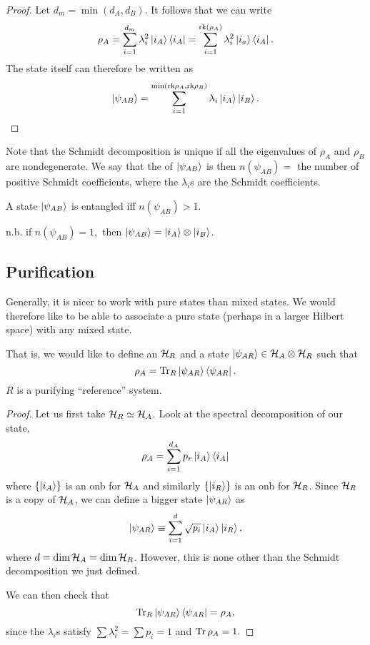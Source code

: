 \begin{proof}
    Let $d_m=\min(d_A,d_B)$. It follows that we can write
    \begin{equation}
        \rho_A = \sum_{i=1}^{d_m} \lambda_i^2 \left| i_A \right>\left< i_A \right| = \sum_{i=1}^{\text{rk}(\rho_A)}\lambda_i^2 \left| i_a \right>\left< i_A \right|.
    \end{equation}
    The state itself can therefore be written as
    \begin{equation}
        \left| \psi_{AB} \right>=\sum_{i=1}^{\min(\text{rk}\rho_A,\text{rk}\rho_B)} \lambda_i \left| i_A \right> \left| i_B \right>.
    \end{equation}
\end{proof}

Note that the Schmidt decomposition is unique if all the eigenvalues of $\rho_A$ and $\rho_B$ are nondegenerate. We say that the  of $\left| \psi_{AB} \right>$ is then $n(\psi_{AB})={}$ the number of positive Schmidt coefficients, where the $\lambda_i$s are the Schmidt coefficients.

\begin{thm}
    A state $\left| \psi_{AB} \right>$ is entangled iff $n(\psi_{AB}) >1$.
\end{thm}
n.b. if $n(\psi_{AB})=1,$ then $\left| \psi_{AB} \right>=\left| i_A \right>\otimes \left| i_B \right>$.

\subsection*{Purification} Generally, it is nicer to work with pure states than mixed states. We would therefore like to be able to associate a pure state (perhaps in a larger Hilbert space) with any mixed state.

That is, we would like to define an $\mathcal H_R$ and a state $\left| \psi_{AR} \right>\in \mathcal H_A \otimes \mathcal H_R$ such that
\begin{equation}
    \rho_A=\operatorname{Tr}_R \left| \psi_{AR} \right>\left< \psi_{AR} \right|.
\end{equation}
$R$ is a purifying ``reference'' system.
\begin{proof}
    Let us first take $\mathcal H_R \simeq \mathcal H_A$. Look at the spectral decomposition of our state,
    \begin{equation}
        \rho_A =\sum_{i=1}^{d_A} p_r \left| i_A \right>\left< i_A \right|
    \end{equation}
    where $\{\left| i_A \right>\}$ is an onb for $\mathcal H_A$ and similarly $\{\left| i_R \right>\}$ is an onb for $\mathcal H_R$. Since $\mathcal H_R$ is a copy of $\mathcal H_A$, we can define a bigger state $\left| \psi_{AR} \right>$ as
    \begin{equation}
        \left| \psi_{AR} \right>\equiv \sum_{i=1}^d \sqrt{p_i}\left| i_A \right> \left| i_R \right>,
    \end{equation}
    where $d=\dim \mathcal H_A = \dim \mathcal H_R$. However, this is none other than the Schmidt decomposition we just defined.
    
    We can then check that
    \begin{equation}
        \operatorname{Tr}_R \left| \psi_{AR} \right>\left< \psi_{AR} \right|= \rho_A,
    \end{equation}
    since the $\lambda_i$s satisfy $\sum \lambda_i^2 =\sum p_i =1$ and $\operatorname{Tr} \rho_A = 1.$
\end{proof}

